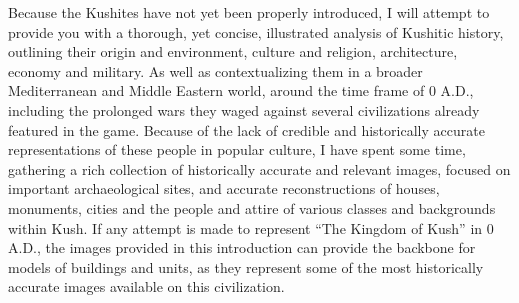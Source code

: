\documentclass[a4paper,12pt]{scrreprt}
\begin{document}
Because the Kushites have not yet been properly introduced, I will attempt to provide you with a thorough, yet concise, illustrated analysis of Kushitic history, outlining their origin and environment, culture and religion, architecture, economy and military. As well as contextualizing them in a broader Mediterranean and Middle Eastern world, around the time frame of 0 A.D., including the prolonged wars they waged against several civilizations already featured in the game. Because of the lack of credible and historically accurate representations of these people in popular culture, I have spent some time, gathering a rich collection of historically accurate and relevant images, focused on important archaeological sites, and accurate reconstructions of houses, monuments, cities and the people and attire of various classes and backgrounds within Kush. If any attempt is made to represent “The Kingdom of Kush” in 0 A.D., the images provided in this introduction can provide the backbone for models of buildings and units, as they represent some of the most historically accurate images available on this civilization.
\end{document}
